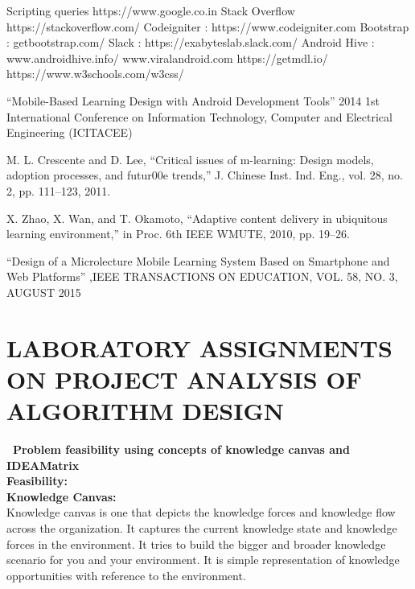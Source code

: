 \documentclass[oneside,a4paper,12pt]{report}
\begin{document}



%

\begin{appendices}
\begin{thebibliography}{99}

 Scripting queries https://www.google.co.in
 Stack Overflow https://stackoverflow.com/ 
 Codeigniter : https://www.codeigniter.com 
 Bootstrap : getbootstrap.com/ 
 Slack : https://exabyteslab.slack.com/
 Android Hive : www.androidhive.info/
 www.viralandroid.com
 https://getmdl.io/ 
 https://www.w3schools.com/w3css/

 “Mobile-Based Learning Design with Android Development Tools” 2014 1st International Conference on Information Technology, Computer and Electrical Engineering (ICITACEE)

 M. L. Crescente and D. Lee, “Critical issues of m-learning: Design models, adoption processes, and futur00e trends,” J. Chinese Inst. Ind. Eng., vol. 28, no. 2, pp. 111–123, 2011.

 X. Zhao, X. Wan, and T. Okamoto, “Adaptive content delivery in ubiquitous learning environment,” in Proc. 6th IEEE WMUTE, 2010, pp. 19–26.

 “Design of a Microlecture Mobile Learning System Based on Smartphone and Web Platforms” ,IEEE TRANSACTIONS ON EDUCATION, VOL. 58, NO. 3, AUGUST 2015

\end{thebibliography}



\chapter{LABORATORY ASSIGNMENTS ON PROJECT ANALYSIS OF ALGORITHM DESIGN}
\newpage
\begin{itemize}
\textbf{\ Problem feasibility using concepts of knowledge canvas and IDEAMatrix}\\

\textbf{Feasibility:}\\
\textbf{Knowledge Canvas:}\\ 
\hspace*{0.3 in} Knowledge canvas is one that depicts the knowledge forces and knowledge flow across the organization. It captures the current knowledge state and knowledge forces in the environment. It tries to build the bigger and broader knowledge scenario for you and your environment. It is simple representation of knowledge opportunities with reference to the environment.\\
	

\end{itemize}
\end{appendices}
\end{document}

